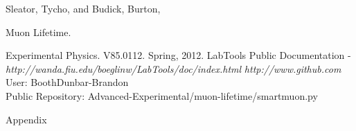 \begin{thebibliography}{99}
Sleator, Tycho, and Budick, Burton, \begin{em}Muon Lifetime. \end{em}Experimental Physics. V85.0112. Spring, 2012.
 LabTools Public Documentation -  \emph{http://wanda.fiu.edu/boeglinw/LabTools/doc/index.html}
 \emph{http://www.github.com} 
\\     User: BoothDunbar-Brandon \\       Public Repository: Advanced-Experimental/muon-lifetime/smartmuon.py
\end{thebibliography}

\newpage \LARGE{Appendix}

  
